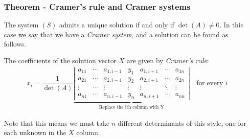 \documentclass[usenames,dvipsnames,aspectratio=169,10pt]{beamer}
\numberwithin{equation}{section}
\begin{document}
\begin{frame}
\frametitle{Theorem - Cramer's rule and Cramer systems}

The system $(S)$ admits a unique solution if and only if $\det(A) \neq 0$. In this case we say that we have a \textit{\textcolor{airforceblue}{Cramer system}}, and a solution can be found as follows. 

The coefficients of the solution vector $X$ are given by \textit{\textcolor{airforceblue}{Cramer's rule}}:
\begin{align*}
x_i = \dfrac{1}{\det(A)}
\underbrace{
\left|
\begin{matrix}
a_{11} & \cdots & a_{1,i-1} & y_1 & a_{1,i+1} & \cdots & a_{1n} \\
a_{21} & \cdots & a_{2,i-1} & y_2 & a_{2,i+1} & \cdots & a_{2n} \\
\vdots & \cdots & \vdots    & \vdots & \vdots & \ddots & \vdots \\
a_{n1} & \cdots & a_{n,i-1} & y_n & a_{n,i+1} & \cdots & a_{nn}
\end{matrix}
\right|
}_{\text{Replace the ith column with Y}}
\quad \text{for every $i$}
\end{align*}

Note that this means we must take $n$ different determinants of this style, one for each unknown in the $X$ column.

\end{frame}
\end{document}
